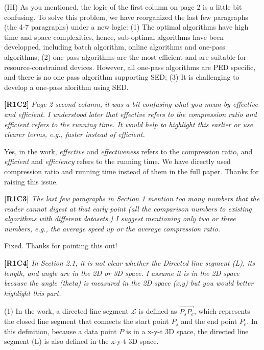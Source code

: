 \documentclass{letter}
\newcommand{\vv}{\overrightarrow}
\begin{document}
(III) As you mentioned, the logic of the first column on page 2 is a little bit confusing. To solve this problem, we have reorganized the last few paragraphs (the 4-7 paragraphs) under a new logic:  (1) The optimal algorithms have high time and space complexities, hence, sub-optimal algorithms have been developped, including batch algorithm, online algorithms and one-pass algorithms; (2) one-pass algorithms are the most efficient and are suitable for resource-constrained devices. However, all one-pass algorithms are PED specific, and there is no one pass algorithm supporting SED; (3) It is challenging to develop a one-pass alorithm using SED.


\textbf{[R1C2]} \emph{Page 2 second column, it was a bit confusing what you mean by effective and efficient. I understood later that effective refers to the compression ratio and efficient refers to the running time. It would help to highlight this earlier or use clearer terms, e.g., faster instead of efficient.}

Yes, in the work, \emph{effective} and \emph{effectiveness} refers to the compression ratio, and \emph{efficient} and \emph{efficiency} refers to the running time. We have directly used compression ratio and running time instead of them in the full paper. Thanks for raising this issue.


\textbf{[R1C3]} \emph{The last few paragraphs in Section 1 mention too many numbers that the reader cannot digest at that early point (all the comparison numbers to existing algorithms with different datasets.) I suggest mentioning only two or three numbers, e.g., the average speed up or the average compression ratio.}

Fixed. Thanks for pointing this out!

\textbf{[R1C4]} \emph{In Section 2.1, it is not clear whether the Directed line segment (L), its length, and angle are in the 2D or 3D space. I assume it is in the 2D space because the angle (theta) is measured in the 2D space (x,y) but you would better highlight this part.}

(1) In the work, a directed line segment $\mathcal{L}$ is defined as $\vv{P_{s}P_{e}}$, which represents the closed line segment that connects the start point $P_s$ and the end point $P_e$. In this definition, because a data point $P$ is in a x-y-t 3D space, the directed line segment (L) is also defined in the x-y-t 3D space.
\end{document}
